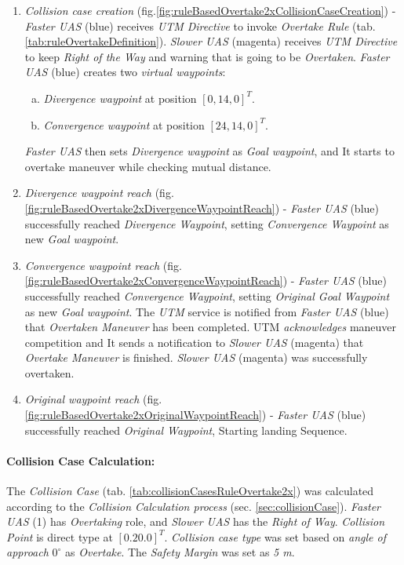     \begin{enumerate}
        \item \emph{Collision case creation} (fig.\ref{fig:ruleBasedOvertake2xCollisionCaseCreation}) - \emph{Faster UAS} (blue) receives \emph{UTM Directive} to invoke \emph{Overtake Rule} (tab. \ref{tab:ruleOvertakeDefinition}). \emph{Slower UAS} (magenta) receives \emph{UTM Directive} to keep \emph{Right of the Way} and warning that is going to be \emph{Overtaken}. \emph{Faster UAS} (blue) creates two \emph{virtual waypoints}:
        \begin{enumerate}[a.]
            \item \emph{Divergence waypoint} at position $[0,14,0]^T$.
            \item \emph{Convergence waypoint} at position $[24,14,0]^T$.
        \end{enumerate}
        \emph{Faster UAS} then sets \emph{Divergence waypoint} as \emph{Goal waypoint}, and It starts to overtake maneuver while checking mutual distance.
        
        \item \emph{Divergence waypoint reach} (fig. \ref{fig:ruleBasedOvertake2xDivergenceWaypointReach}) - \emph{Faster UAS} (blue) successfully reached \emph{Divergence Waypoint}, setting \emph{Convergence Waypoint} as new \emph{Goal waypoint}.
        
        \item \emph{Convergence waypoint reach} (fig. \ref{fig:ruleBasedOvertake2xConvergenceWaypointReach}) - \emph{Faster UAS} (blue) successfully reached \emph{Convergence Waypoint}, setting \emph{Original Goal Waypoint} as new \emph{Goal waypoint}. The \emph{UTM} service is notified from \emph{Faster UAS} (blue) that \emph{Overtaken Maneuver} has been completed. UTM \emph{acknowledges} maneuver competition and It sends a notification to \emph{Slower UAS} (magenta) that \emph{Overtake Maneuver} is finished. \emph{Slower UAS} (magenta) was successfully overtaken.
        
        \item \emph{Original waypoint reach} (fig. \ref{fig:ruleBasedOvertake2xOriginalWaypointReach}) - \emph{Faster UAS} (blue) successfully reached \emph{Original Waypoint}, Starting landing Sequence. 
    \end{enumerate}
    

    \paragraph{Collision Case Calculation:} The \emph{Collision Case} (tab. \ref{tab:collisionCasesRuleOvertake2x}) was calculated according to the \emph{Collision Calculation process} (sec. \ref{sec:collisionCase}). \emph{Faster UAS} (1) has \emph{Overtaking} role, and \emph{Slower UAS} has the \emph{Right of Way}. \emph{Collision Point} is direct type at $[0.20.0]^T$. \emph{Collision case type} was set based on \emph{angle of approach} $0^{\circ}$ as \emph{Overtake}. The \emph{Safety Margin} was set as \emph{5 m}.
    

